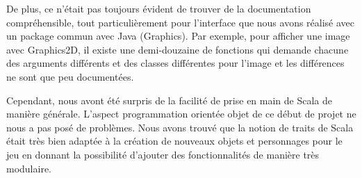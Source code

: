 \documentclass[10pt,a4paper]{article}
\begin{document}
De plus, ce n'était pas toujours évident de trouver de la documentation compréhensible, tout particulièrement pour l'interface que nous avons réalisé avec un package commun avec Java (Graphics). Par exemple, pour afficher une image avec Graphics2D, il existe une demi-douzaine de fonctions qui demande chacune des arguments différents et des classes différentes pour l'image et les différences ne sont que peu documentées.

Cependant, nous avont été surpris de la facilité de prise en main de Scala de manière générale.
L'aspect programmation orientée objet de ce début de projet ne nous a pas posé de problèmes. Nous avons trouvé que la notion de traits de Scala était très bien adaptée à la création de nouveaux objets et personnages pour le jeu en donnant la possibilité d'ajouter des fonctionnalités de manière très modulaire.


%
\end{document}
